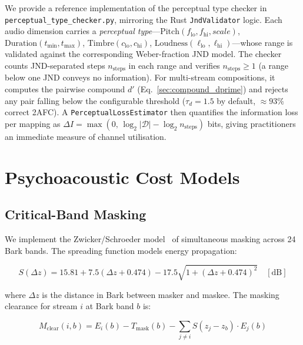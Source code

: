 \documentclass[sigchi, nonacm]{acmart}
\begin{document}
We provide a reference implementation of the perceptual type checker in
\texttt{perceptual\_type\_checker.py}, mirroring the Rust \texttt{JndValidator}
logic.  Each audio dimension carries a \emph{perceptual type}---$\mathrm{Pitch}(f_\mathrm{lo}, f_\mathrm{hi}, \mathit{scale})$, $\mathrm{Duration}(t_\mathrm{min}, t_\mathrm{max})$, $\mathrm{Timbre}(c_\mathrm{lo}, c_\mathrm{hi})$, $\mathrm{Loudness}(\ell_\mathrm{lo}, \ell_\mathrm{hi})$---whose range is validated against
the corresponding Weber-fraction JND model.  The checker counts JND-separated
steps $n_\mathrm{steps}$ in each range and verifies $n_\mathrm{steps} \geq 1$
(a range below one JND conveys no information).  For multi-stream
compositions, it computes the pairwise compound $d'$ (Eq.~\ref{sec:compound_dprime})
and rejects any pair falling below the configurable threshold
($\tau_d = 1.5$ by default, $\approx 93\%$ correct 2AFC).
A \texttt{PerceptualLossEstimator} then quantifies the information loss per
mapping as $\Delta I = \max(0,\,\log_2 |\mathcal{D}| - \log_2 n_\mathrm{steps})$
bits, giving practitioners an immediate measure of channel utilisation.

\section{Psychoacoustic Cost Models}
\label{sec:psychoacoustic}

\subsection{Critical-Band Masking}

We implement the Zwicker/Schroeder model~\cite{zwicker2013psychoacoustics, schroeder1979optimum} of simultaneous masking across 24 Bark bands. The spreading function models energy propagation:

\begin{equation}
S(\Delta z) = 15.81 + 7.5(\Delta z + 0.474) - 17.5\sqrt{1 + (\Delta z + 0.474)^2} \quad [\mathrm{dB}]
\label{eq:spreading}
\end{equation}

where $\Delta z$ is the distance in Bark between masker and maskee. The masking clearance for stream $i$ at Bark band $b$ is:

\begin{equation}
M_\mathrm{clear}(i, b) = E_i(b) - T_\mathrm{mask}(b) - \sum_{j \neq i} S(z_j - z_b) \cdot E_j(b)
\end{equation}
\end{document}
